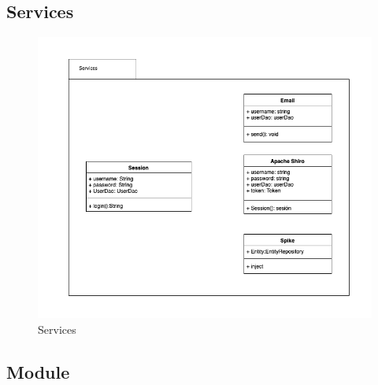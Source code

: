 \documentclass[enabledeprecatedfontcommands,fontsize=12pt,paper=a4,twoside]{scrartcl}
\begin{document}
\subsection{Services}
\begin{figure}[H]
\begin{center}
 \includegraphics[width=\textwidth]{UML/services.png}
  \caption{Services}
  \label{fig:boat1}
\end{center}
\end{figure}



\subsection{Module}
\end{document}
